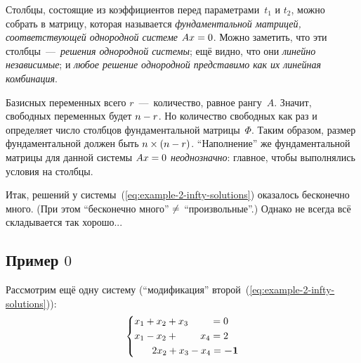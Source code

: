 \documentclass[a4paper,12pt]{article}
\begin{document}
  Столбцы, состоящие из коэффициентов перед параметрами~$t_1$ и $t_2$, можно собрать в матрицу, которая называется \emph{фундаментальной матрицей, соответствующей однородной системе $Ax \hm= 0$}.
  Можно заметить, что эти столбцы~---~\emph{решения однородной системы}; ещё видно, что они \emph{линейно независимые}; и \emph{любое решение однородной представимо как их линейная комбинация}.
  
  Базисных переменных всего $r$~---~количество, равное рангу~$A$.
  Значит, свободных переменных будет $n \hm- r$.
  Но количество свободных как раз и определяет число столбцов фундаментальной матрицы~$\Phi$.
  Таким образом, размер фундаментальной должен быть $n \hm\times (n \hm- r)$.
  ``Наполнение'' же фундаментальной матрицы для данной системы $Ax \hm= 0$ \emph{неоднозначно}: главное, чтобы выполнялись условия на столбцы.

  Итак, решений у системы~(\ref{eq:example-2-infty-solutions}) оказалось бесконечно много.
  (При этом ``бесконечно много'' $\hm{\not=}$ ``произвольные''.)
  Однако не всегда всё складывается так хорошо...


  \subsection{Пример $0$}

  Рассмотрим ещё одну систему (``модификация'' второй~(\ref{eq:example-2-infty-solutions})):
  \begin{equation}\label{eq:example-3-no-solutions}
    \left\{ \begin{aligned}
      &x_1 + x_2 + x_3 \hphantom{{} + x_4} = 0\\
      &x_1 - x_2 + \hphantom{x_3 + {}} x_4 = 2\\
      &\hphantom{x_1 + } 2x_2 + x_3 - x_4 = \bds{-1}
    \end{aligned} \right.
  \end{equation}
\end{document}
